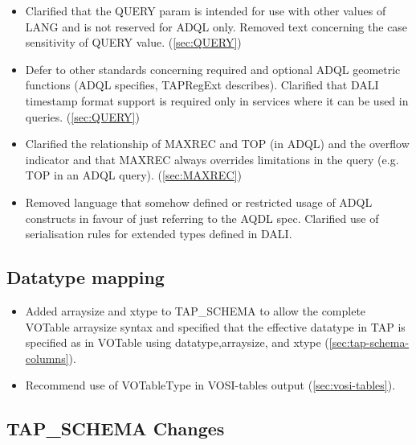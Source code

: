 \documentclass[11pt,letter]{ivoa}
\newcommand{\tapschema}{TAP\_SCHE\-MA}
\newcommand{\tapschema}{\mbox{%
  \relsize{-0.5}TAP\discretionary{-}{}{\kern-2pt\_}SCHEMA}}
\begin{document}
\begin{itemize}
\item Clarified that the QUERY param is intended for use with other values of LANG and is not
reserved for ADQL only. Removed text concerning the case sensitivity of QUERY value. (\ref{sec:QUERY})

\item Defer to other standards concerning required and optional ADQL geometric functions (ADQL specifies,
TAPRegExt describes). 
Clarified that DALI timestamp format support is required only in services where it can be used in queries. (\ref{sec:QUERY})

\item Clarified the relationship of MAXREC and TOP (in ADQL) and the overflow 
indicator and that MAXREC always overrides limitations in the query (e.g. 
TOP in an ADQL query). (\ref{sec:MAXREC})

\item Removed language that somehow defined or restricted usage of ADQL constructs in
favour of just referring to the AQDL spec. Clarified use of serialisation
rules for extended types defined in DALI.
\end{itemize}

\subsection{Datatype mapping}

\begin{itemize}
\item Added arraysize and xtype to \tapschema{} to allow the complete VOTable arraysize syntax and specified that the effective datatype in TAP is specified as in VOTable using datatype,arraysize, and xtype (\ref{sec:tap-schema-columns}).

\item Recommend use of VOTableType in VOSI-tables output (\ref{sec:vosi-tables}). 
\end{itemize}

\subsection{TAP\_SCHEMA Changes}
\end{document}
